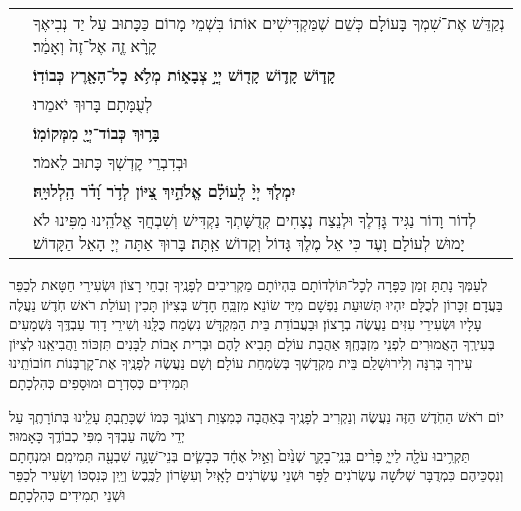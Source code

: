 \documentclass[twoside, openany, parskip=half, 11pt]{book}
\begin{document}
\newcommand{\kedusmusafchol}[2]{
\ssubsection{\adforn{48} #1 \adforn{22}}

\begin{small}
\begin{tabular}{l p{.85\textwidth}}

\shatz &
נְקַדֵּשׁ אֶת־שִׁמְךָ בָּעוֹלָם כְּשֵׁם שֶׁמַּקְדִּישִׁים אוֹתוֹ בִּשְׁמֵי מָרוֹם כַּכָּתוּב עַל יַד נְבִיאֶךָ קָרָ֨א זֶ֤ה אֶל־זֶה֙ וְאָמַ֔ר׃\\

\shatzvkahal &
\textbf{ קָד֧וֹשׁ קָד֛וֹשׁ קָד֖וֹשׁ יְיָ֣ צְבָא֑וֹת מְלֹ֥א כׇל־הָאָ֖רֶץ כְּבוֹדֽוֹ׃} \\

\shatz &
לְעֻמָּתָם בָּרוּךְ יֹאמֵרוּ׃\\

\shatzvkahal &
\textbf{בָּר֥וּךְ כְּבוֹד־יְיָ֖ מִמְּקוֹמֽוֹ׃}\\

\shatz &
וּבְדִבְרֵי קׇדְשְׁךָ כָּתוּב לֵאמֹר׃ \\

\shatzvkahal &
\textbf{יִמְלֹ֤ךְ יְיָ֨ לְֽעוֹלָ֗ם אֱלֹהַ֣יִךְ צִ֭יּוֹן לְדֹ֥ר וָ֝דֹ֗ר הַֽלְלוּיָֽהּ׃}\\

\shatz &
לְדוֹר וָדוֹר נַגִּיד גׇּדְלֶךָ וּלְנֵצַח נְצָחִים קְדֻשָּׁתְךָ נַקְדִּישׁ וְשִׁבְחֲךָ אֱלֹהֵֽינוּ מִפִּינוּ לֹא יָמוּשׁ לְעוֹלָם וָעֶד כִּי אֵל מֶלֶךְ גָּדוֹל וְקָדוֹשׁ אַֽתָּה׃ בָּרוּךְ אַתָּה יְיָ הָאֵל הַקָּדוֹשׁ׃ #2\\
\end{tabular}

\end{small}}

\nextpage

\kedusmusafchol{קדושה}{}

לְעַמְּךָ נָתַתָּ זְמַן כַּפָּרָה לְכׇל־תּוֹלְדוֹתָם בִּהְיוֹתָם מַקְרִיבִים לְפָנֶֽיךָ זִבְחֵי רָצוֹן וּשְׂעִירֵי חַטָּאת לְכַפֵּר בַּעֲדָם׃ זִכָּרוֹן לְכֻלָּם יִהְיוּ תְּשׁוּעַת נַפְשָׁם מִיַּד שׂוֹנֵא׃ מִזְבֵּֽחַ חָדָשׁ בְּצִיּוֹן תָּכִין וְעוֹלַת רֹאשׁ חֹֽדֶשׁ נַעֲלֶה עָלָיו וּשְׂעִירֵי עִזִּים נַעֲשֶׂה בְרָצוֹן׃ וּבַעֲבוֹדַת בֵּית הַמִּקְדָּשׁ נִשְׂמַח כֻּלָּֽנוּ וְשִׁירֵי דָוִד עַבְדֶּֽךָ נִּשְׁמָעִים בְּעִירֶֽךָ הָאֲמוּרִים לִפְנֵי מִזְבְּחֶֽךָ׃ אַהֲבַת עוֹלָם תָּבִיא לָהֶם וּבְרִית אָבוֹת לַבָּנִים תִּזְכּוֹר׃ וַהֲבִיאֵֽנוּ לְצִיּוֹן עִירְךָ בְּרִנָּה וְלִירוּשָׁלַ‍ִם בֵּית מִקְדָשְׁךָ בְּשִׂמְחַת עוֹלָם׃ וְשָׁם נַעֲשֶׂה לְפָנֶֽיךָ אֶת־קׇרְבְּנוֹת חוֹבוֹתֵֽינוּ תְּמִידִים כְּסִדְרָם וּמוּסָפִים כְּהִלְכָתָם׃

יוֹם רֹאשׁ הַחֹֽדֶשׁ
הַזֶּה נַעֲשֶׂה וְנַקְרִיב לְפָנֶֽיךָ בְּאַהֲבָה כְּמִצְוַת רְצוֹנֶֽךָ כְּמוֹ שֶׁכָּתַֽבְתָּ עָלֵֽינוּ בְּתוֹרָתֶֽךָ עַל יְדֵי מֹשֶׁה עַבְדְּךָ מִפִּי כְבוֹדֶֽךָ כָּאָמוּר׃\\
תַּקְרִ֥יבוּ עֹלָ֖ה לַייָ֑ פָּרִ֨ים בְּנֵֽי־בָקָ֤ר שְׁנַ֙יִם֙ וְאַ֣יִל אֶחָ֔ד כְּבָשִׂ֧ים בְּנֵי־שָׁנָ֛ה שִׁבְעָ֖ה תְּמִימִֽם׃ וּמִנְחָתָם וְנִסְכֵּיהֶם כִּמְדֻבָּר שְׁלֹשָׁה עֶשְׂרֹנִים לַפָּר וּשְׁנֵי עֶשְׂרֹנִים לָאָֽיִל וְעִשָּׂרוֹן לַכֶּֽבֶשׂ וְיַֽיִן כְּנִסְכּוֹ וְשָׂעִיר לְכַפֵּר וּשְׁנֵי תְמִידִים כְּהִלְכָתָם׃
\end{document}
